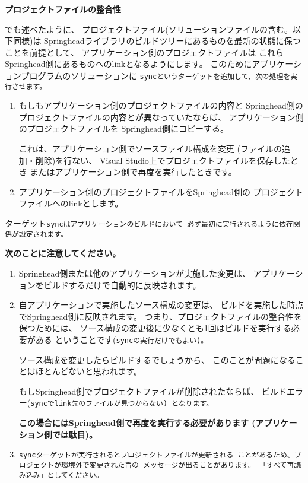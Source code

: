 \bigskip
\noindent
\bf{プロジェクトファイルの整合性}
\begin{narrow}[20pt]
	でも述べたように、
	プロジェクトファイル(ソリューションファイルの含む。以下同様)は
	Springheadライブラリのビルドツリーにあるものを最新の状態に保つことを前提として、
	アプリケーション側のプロジェクトファイルは
	これらSpringhead側にあるものへのlinkとなるようにします。
	このためにアプリケーションプログラムのソリューションに
	\tt{sync}というターゲットを追加して、次の処理を実行させます。
	\begin{enumerate}
	  \item	もしもアプリケーション側のプロジェクトファイルの内容と
		Springhead側のプロジェクトファイルの内容とが異なっていたならば、
		アプリケーション側のプロジェクトファイルを
		Springhead側にコピーする。
		\begin{narrow}[s][15pt]
		これは、アプリケーション側でソースファイル構成を変更
		(ファイルの追加・削除)を行ない、
		Visual Studio上でプロジェクトファイルを保存したとき
		またはアプリケーション側で再度\cmake を実行したときです。
		\end{narrow}

	  \item	アプリケーション側のプロジェクトファイルをSpringhead側の
		プロジェクトファイルへのlinkとします。
	\end{enumerate}
	ターゲット\tt{sync}はアプリケーションのビルドにおいて
	必ず最初に実行されるように依存関係が設定されます。
\end{narrow}	
\begin{narrow}[20pt]
	\thinrule{\linewidth}
	{\bf{次のことに注意してください。}}

	\medskip
	\begin{enumerate}
	  \item	Springhead側または他のアプリケーションが実施した変更は、
		アプリケーションをビルドするだけで自動的に反映されます。

	  \item	自アプリケーションで実施したソース構成の変更は、
		ビルドを実施した時点でSpringhead側に反映されます。
		つまり、プロジェクトファイルの整合性を保つためには、
		ソース構成の変更後に少なくとも1回はビルドを実行する必要がある
		ということです(\tt{sync}の実行だけでもよい)。
		\begin{narrow}[s][15pt]
		ソース構成を変更したらビルドするでしょうから、
		このことが問題になることはほとんどないと思われます。

		もしSpringhead側でプロジェクトファイルが削除されたならば、
		ビルドエラー(\tt{sync}でlink先のファイルが見つからない)
		となります。
		
		{\bf{この場合にはSpringhead側で再度\cmake を実行する必要があります
		(アプリケーション側では駄目)。}}
		\end{narrow}

	  \item	\tt{sync}ターゲットが実行されるとプロジェクトファイルが更新される
		ことがあるため、\UpKQs プロジェクトが環境外で変更された\UpKQe 旨の
		メッセージが出ることがあります。
		「すべて再読み込み」としてください。
	\end{enumerate}

	\thinrule{\linewidth}
\end{narrow}	

